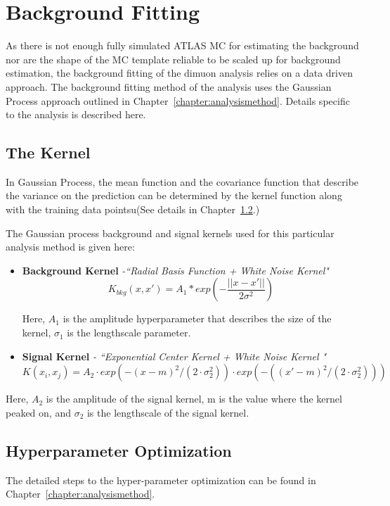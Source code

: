 \section{Background Fitting}
As there is not enough fully simulated ATLAS MC for estimating the background nor are the shape of the MC template reliable to be scaled up for background estimation, the background fitting of the dimuon analysis relies on a data driven approach. The background fitting method of the analysis uses the Gaussian Process approach outlined in Chapter~\ref{chapter:analysismethod}. Details specific to the analysis is described here.

\subsection{The Kernel}
In Gaussian Process, the mean function and the covariance function that describe the variance on the prediction can be determined by the kernel function along with the training data pointsu(See details in Chapter~\ref{}.)

The Gaussian process background and signal kernels used for this particular analysis method is given here:

\begin{itemize}
    \item \textbf{Background Kernel} \textit{-``Radial Basis Function + White Noise Kernel"}
        \begin{equation}
                K_{bkg}(x, x') = A_{1} * exp(-\frac{||x-x'||}{2\sigma^{2}}) 
        \label{eq:backgroundkernel}
        \end{equation}

    Here, $A_{1}$ is the amplitude hyperparameter that describes the size of the kernel, $\sigma_{1}$ is the lengthscale parameter.
\item \textbf{Signal Kernel} \textit{- ``Exponential Center Kernel + White Noise Kernel "}
            \begin{equation}
            K(x_{i}, x_{j})=A_{2}\cdot exp(-(x-m)^{2}/(2\cdot\sigma_{2}^{2}))\cdot exp(-((x'-m)^{2}/(2\cdot\sigma_{2}^{2})))
            \end{equation}
\end{itemize}

    Here, $A_{2}$ is the amplitude of the signal kernel, m is the value where the kernel peaked on, and $\sigma_{2}$ is the lengthscale of the signal kernel. 

\subsection{Hyperparameter Optimization}
The detailed steps to the hyper-parameter optimization can be found in Chapter~\ref{chapter:analysismethod}.

